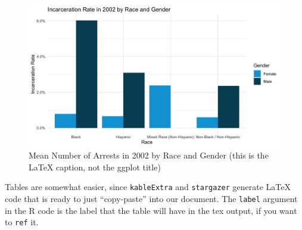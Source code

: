 \documentclass{article}
\begin{document}
\begin{figure}[H]
    \begin{center}
        \includegraphics[width=.85\textwidth]{incarceration_rate_by_racegender}
    \end{center}
    \caption{Mean Number of Arrests in 2002 by Race and Gender (this is the LaTeX caption, not the ggplot title)}
    \label{fig:graph}
\end{figure}


Tables are somewhat easier, since \texttt{kableExtra} and \texttt{stargazer} generate LaTeX code that is ready to just ``copy-paste'' into our document. The \texttt{label} argument in the R code is the label that the table will have in the tex output, if you want to \texttt{ref} it.




\end{document}
